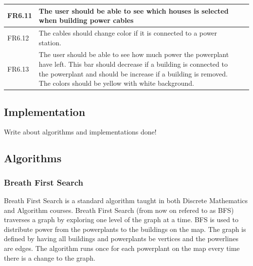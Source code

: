 \begin{tabular}{| p{1.2cm} | p{8cm} | p{3cm} |}
		FR6.11 & The user should be able to see which houses is selected when 
		building power cables & \\ \hline

		FR6.12 & The cables should change color if it is connected to a power 
		station. & \\ \hline

		FR6.13 & The user should be able to see how much power the powerplant have 
		left. This bar should decrease if a building is connected to the powerplant 
		and should be increase if a building is removed. The colors should be yellow 
		with white background. & \\ \hline

	\end{tabular}

\subsection{Implementation}

	Write about algorithms and implementations done!
	
	\subsection*{Algorithms}

		\subsubsection*{Breath First Search}
			Breath First Search is a standard algorithm taught in both Discrete Mathematics and 
			Algorithm courses. Breath First Search (from now on refered to as BFS) traverses a graph 
			by exploring one level of the graph at a time. BFS is used to distribute power from the 
			powerplants to the buildings on the map. The graph is defined by having all buildings 
			and powerplants be vertices and the powerlines are edges. The algorithm runs once for 
			each powerplant on the map every time there is a change to the graph.

